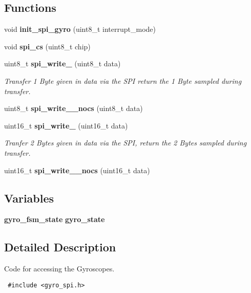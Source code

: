 \subsection*{Functions}
\begin{CompactItemize}
\item 
void {\bf init\_\-spi\_\-gyro} (uint8\_\-t interrupt\_\-mode)
\item 
void {\bf spi\_\-cs} (uint8\_\-t chip)
\item 
uint8\_\-t {\bf spi\_\-write\_} (uint8\_\-t data)
\begin{CompactList}\small\item\em Transfer 1 Byte given in data via the SPI return the 1 Byte sampled during transfer. \item\end{CompactList}\item 
uint8\_\-t {\bf spi\_\-write\_\_\-nocs} (uint8\_\-t data)
\item 
uint16\_\-t {\bf spi\_\-write\_} (uint16\_\-t data)
\begin{CompactList}\small\item\em Tranfer 2 Bytes given in data via the SPI, return the 2 Bytes sampled during transfer. \item\end{CompactList}\item 
uint16\_\-t {\bf spi\_\-write\_\_\-nocs} (uint16\_\-t data)
\end{CompactItemize}
\subsection*{Variables}
\begin{CompactItemize}
\item 
{\bf gyro\_\-fsm\_\-state} {\bf gyro\_\-state}
\end{CompactItemize}


\subsection{Detailed Description}
Code for accessing the Gyroscopes. 



\begin{Code}\begin{verbatim} #include <gyro_spi.h> 
\end{verbatim}\end{Code}



